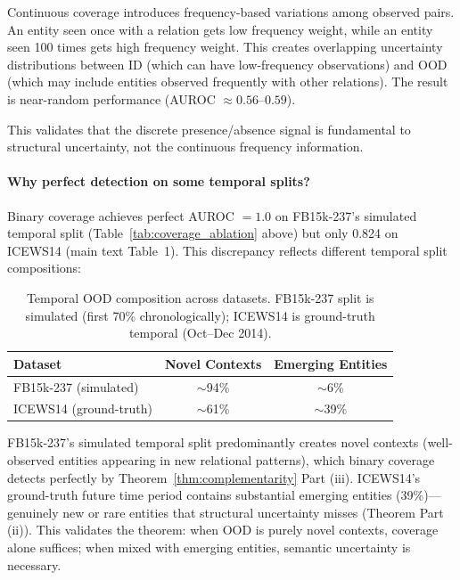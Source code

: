 \documentclass[accepted]{uai2024}  %
\begin{document}
Continuous coverage introduces frequency-based variations among observed pairs. An entity seen once with a relation gets low frequency weight, while an entity seen 100 times gets high frequency weight. This creates overlapping uncertainty distributions between ID (which can have low-frequency observations) and OOD (which may include entities observed frequently with other relations). The result is near-random performance (AUROC $\approx 0.56$--$0.59$).

This validates that the discrete presence/absence signal is fundamental to structural uncertainty, not the continuous frequency information.

\paragraph{Why perfect detection on some temporal splits?}
Binary coverage achieves perfect AUROC $= 1.0$ on FB15k-237's simulated temporal split (Table~\ref{tab:coverage_ablation} above) but only 0.824 on ICEWS14 (main text Table~1). This discrepancy reflects different temporal split compositions:

\begin{table}[h]
\centering
\caption{Temporal OOD composition across datasets. FB15k-237 split is simulated (first 70\% chronologically); ICEWS14 is ground-truth temporal (Oct--Dec 2014).}
\label{tab:temporal_composition}
\vspace{0.3em}
\small
\begin{tabular}{lcc}
\toprule
Dataset & Novel Contexts & Emerging Entities \\
\midrule
FB15k-237 (simulated) & $\sim$94\% & $\sim$6\% \\
ICEWS14 (ground-truth) & $\sim$61\% & $\sim$39\% \\
\bottomrule
\end{tabular}
\end{table}

FB15k-237's simulated temporal split predominantly creates novel contexts (well-observed entities appearing in new relational patterns), which binary coverage detects perfectly by Theorem~\ref{thm:complementarity} Part (iii). ICEWS14's ground-truth future time period contains substantial emerging entities (39\%)---genuinely new or rare entities that structural uncertainty misses (Theorem Part (ii)). This validates the theorem: when OOD is purely novel contexts, coverage alone suffices; when mixed with emerging entities, semantic uncertainty is necessary.
\end{document}

